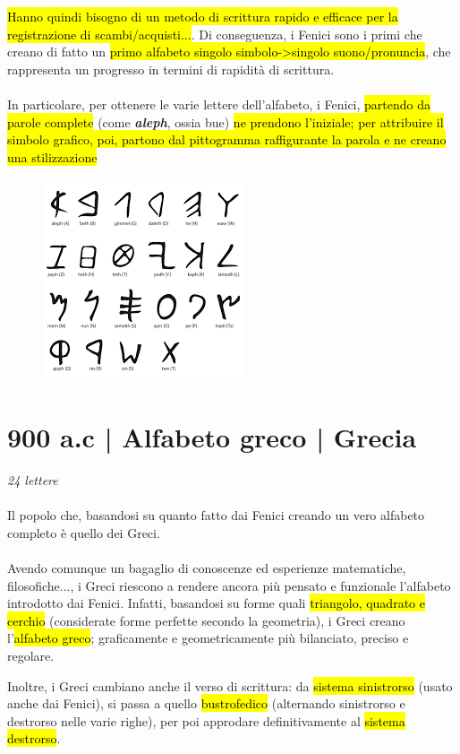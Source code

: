 \hl{Hanno quindi bisogno di un metodo di scrittura rapido e efficace per la registrazione di scambi/acquisti...}. Di conseguenza, i Fenici sono i primi che creano di fatto un \hl{primo alfabeto singolo simbolo->singolo suono/pronuncia}, che rappresenta un progresso in termini di rapidità di scrittura.
\\\\
In particolare, per ottenere le varie lettere dell'alfabeto, i Fenici, \hl{partendo da parole complete }(come \textbf{\textit{aleph}}, ossia bue) \hl{ne prendono l'iniziale; per attribuire il simbolo grafico, poi, partono dal pittogramma raffigurante la parola e ne creano una stilizzazione}

\begin{figure}[H]
    \centering
    \includegraphics[width=0.3\linewidth]{lezione_3/imgs/images.png}
\end{figure}

\section{900 a.c | Alfabeto greco | Grecia}
{\huge \textit{24 lettere}}\\\\
Il popolo che, basandosi su quanto fatto dai Fenici creando un vero alfabeto completo è quello dei Greci.
\\\\
Avendo comunque un bagaglio di conoscenze ed esperienze matematiche, filosofiche..., i Greci riescono a rendere ancora più pensato e funzionale l'alfabeto introdotto dai Fenici.
Infatti, basandosi su forme quali \hl{triangolo, quadrato e cerchio} (considerate forme perfette secondo la geometria), i Greci creano l'\hl{alfabeto greco}; graficamente e geometricamente più bilanciato, preciso e regolare.

Inoltre, i Greci cambiano anche il verso di scrittura: da \hl{sistema sinistrorso} (usato anche dai Fenici), si passa a quello \hl{bustrofedico} (alternando sinistrorso e destrorso nelle varie righe), per poi approdare definitivamente al \hl{sistema destrorso}.

